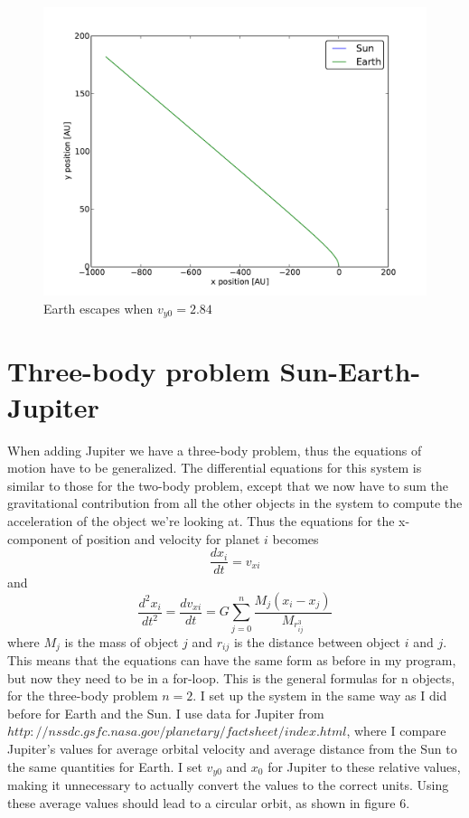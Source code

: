 \documentclass[a4paper,12pt, english]{article}
\begin{document}
\begin{figure}[!h]
\centering
\includegraphics[scale = 0.5]{Fig5.pdf}
\caption{Earth escapes when $v_{y0} = 2.84$}
\end{figure} 

\section*{Three-body problem Sun-Earth-Jupiter}
When adding Jupiter we have a three-body problem, thus the equations of motion have to be generalized. The differential equations for this system is similar to those for the two-body problem, except that we now have to sum the gravitational contribution from all the other objects in the system to compute the acceleration of the object we're looking at. Thus the equations for the x-component of position and velocity for planet $i$ becomes
\[
\frac{dx_i}{dt}=v_{xi} 
\]
and
\[
\frac{d^2x_i}{dt^2}=\frac{dv_{xi}}{dt}=G\sum_{j=0}^n \frac{M_j(x_i-x_j)}{M_{r_{ij}^3}}
\]
where $M_j$ is the mass of object $j$ and $r_{ij}$ is the distance between object $i$ and $j$. This means that the equations can have the same form as before in my program, but now they need to be in a for-loop. This is the general formulas for n objects, for the three-body problem $n=2$. I set up the system in the same way as I did before for Earth and the Sun. I use data for Jupiter from $http://nssdc.gsfc.nasa.gov/planetary/factsheet/index.html$, where I compare Jupiter's values for average orbital velocity and average distance from the Sun to the same quantities for Earth. I set $v_{y0}$ and $x_0$ for Jupiter to these relative values, making it unnecessary to actually convert the values to the correct units. Using these average values should lead to a circular orbit, as shown in figure 6. 
\end{document}
